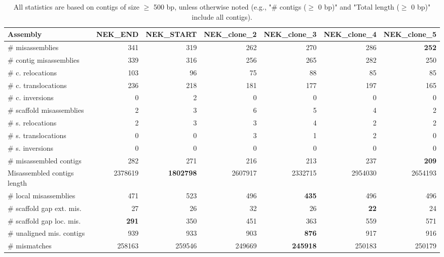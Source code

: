 \documentclass[12pt,a4paper]{article}
\begin{document}
\begin{table}[ht]
\begin{center}
\caption{All statistics are based on contigs of size $\geq$ 500 bp, unless otherwise noted (e.g., "\# contigs ($\geq$ 0 bp)" and "Total length ($\geq$ 0 bp)" include all contigs).}
\begin{tabular}{|l*{6}{|r}|}
\hline
Assembly & NEK\_END & NEK\_START & NEK\_clone\_2 & NEK\_clone\_3 & NEK\_clone\_4 & NEK\_clone\_5 \\ \hline
\# misassemblies & 341 & 319 & 262 & 270 & 286 & {\bf 252} \\ \hline
\hspace{2mm}\# contig misassemblies & 339 & 316 & 256 & 265 & 282 & 250 \\ \hline
\hspace{5mm}\# c. relocations & 103 & 96 & 75 & 88 & 85 & 85 \\ \hline
\hspace{5mm}\# c. translocations & 236 & 218 & 181 & 177 & 197 & 165 \\ \hline
\hspace{5mm}\# c. inversions & 0 & 2 & 0 & 0 & 0 & 0 \\ \hline
\hspace{2mm}\# scaffold misassemblies & 2 & 3 & 6 & 5 & 4 & 2 \\ \hline
\hspace{5mm}\# s. relocations & 2 & 3 & 3 & 4 & 2 & 2 \\ \hline
\hspace{5mm}\# s. translocations & 0 & 0 & 3 & 1 & 2 & 0 \\ \hline
\hspace{5mm}\# s. inversions & 0 & 0 & 0 & 0 & 0 & 0 \\ \hline
\# misassembled contigs & 282 & 271 & 216 & 213 & 237 & {\bf 209} \\ \hline
Misassembled contigs length & 2378619 & {\bf 1802798} & 2607917 & 2332715 & 2954030 & 2654193 \\ \hline
\# local misassemblies & 471 & 523 & 496 & {\bf 435} & 496 & 496 \\ \hline
\# scaffold gap ext. mis. & 27 & 26 & 32 & 26 & {\bf 22} & 24 \\ \hline
\# scaffold gap loc. mis. & {\bf 291} & 350 & 451 & 363 & 559 & 571 \\ \hline
\# unaligned mis. contigs & 939 & 933 & 903 & {\bf 876} & 917 & 916 \\ \hline
\# mismatches & 258163 & 259546 & 249669 & {\bf 245918} & 250183 & 250179 \\ \hline

\end{tabular}
\end{center}
\end{table}
\end{document}
